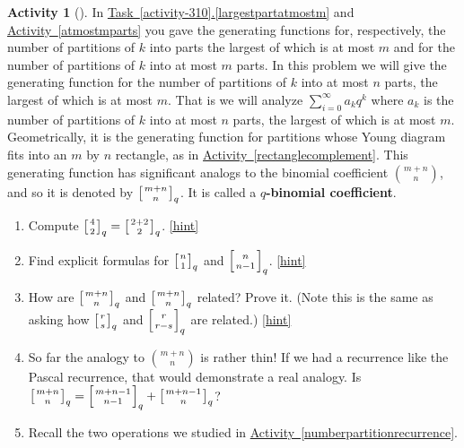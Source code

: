 \documentclass[10pt,]{book}
\newcommand{\terminology}[1]{\textbf{#1}}
\theoremstyle{plain}
\theoremstyle{definition}
\theoremstyle{definition}
\theoremstyle{definition}
\newtheorem{activity}[project]{Activity}
\numberwithin{equation}{chapter}
\newcommand{\qchoose}[2]{\left[{#1\atop#2}\right]_q}
\begin{document}
\begin{activity}[]\label{qtorialformula}
\hypertarget{p-1613}{}%
In \hyperref[largestpartatmostm]{Task~\ref{activity-310}.\ref{largestpartatmostm}} and \hyperref[atmostmparts]{Activity~\ref{atmostmparts}} you gave the generating functions for, respectively, the number of partitions of \(k\) into parts the largest of which is at most \(m\) and for the number of partitions of \(k\) into at most \(m\) parts. In this problem we will give the generating function for the number of partitions of \(k\) into at most \(n\) parts, the largest of which is at most \(m\). That is we will analyze \(\sum_{i=0}^\infty a_kq^k\) where \(a_k\) is the number of partitions of \(k\) into at most \(n\) parts, the largest of which is at most \(m\). Geometrically, it is the generating function for partitions whose Young diagram fits into an \(m\) by \(n\) rectangle, as in \hyperref[rectanglecomplement]{Activity~\ref{rectanglecomplement}}. This generating function has significant analogs to the binomial coefficient \(\binom{m+n}{n}\), and so it is denoted by \(\qchoose{m+n}{n}\). It is called a \terminology{\(q\)-binomial coefficient}.%
\begin{enumerate}[font=\bfseries,label=(\alph*),ref=\alph*]
\item\label{task-279} \hypertarget{p-1614}{}%
Compute \(\qchoose{4}{2}=\qchoose{2+2}{2}\).%
\hfill{\tiny\hyperlink{a-327.a}{[hint]}\hypertarget{q-327.a}{}}\item\label{task-280} \hypertarget{p-1617}{}%
Find explicit formulas for \(\qchoose{n}{1}\) and \(\qchoose{n}{n-1}\).%
\hfill{\tiny\hyperlink{a-327.b}{[hint]}\hypertarget{q-327.b}{}}\item\label{task-281} \hypertarget{p-1620}{}%
How are \(\qchoose{m+n}{n}\) and \(\qchoose{m+n}{n}\) related? Prove it. (Note this is the same as asking how \(\qchoose{r}{s}\) and \(\qchoose{r}{r-s}\) are related.)%
\hfill{\tiny\hyperlink{a-327.c}{[hint]}\hypertarget{q-327.c}{}}\item\label{task-282} \hypertarget{p-1623}{}%
So far the analogy to \(\binom{m+n}{n}\) is rather thin! If we had a recurrence like the Pascal recurrence, that would demonstrate a real analogy. Is \(\qchoose{m+n}{n}= \qchoose{m+n-1}{n-1}+\qchoose{m+n-1}{n}\)?%
\item\label{task-283} \hypertarget{p-1625}{}%
Recall the two operations we studied in \hyperref[numberpartitionrecurrence]{Activity~\ref{numberpartitionrecurrence}}.%
\begin{enumerate}[font=\bfseries,label=(\roman*),ref=\theenumi.\roman*]

\end{enumerate}
\end{enumerate}
\end{activity}
\end{document}
